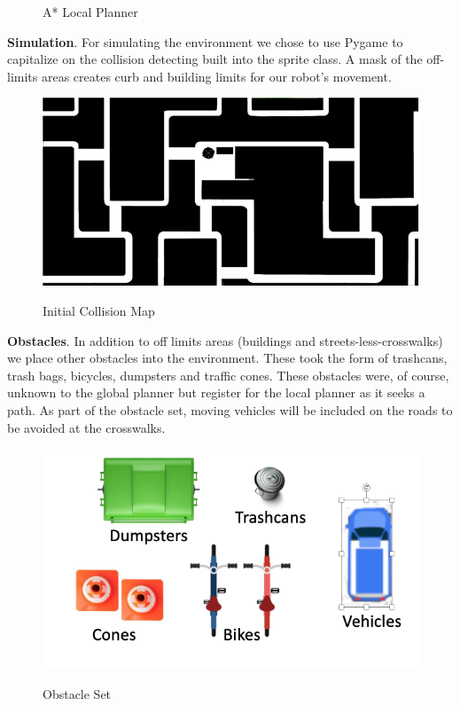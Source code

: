 \documentclass{article}
\begin{document}
\begin{multicols}{2}
\begin{figure}[H]
     \label{fig:astar}
     \caption{A* Local Planner}
\end{figure}
\noindent \textbf{Simulation}. For simulating the environment we chose to use Pygame to capitalize on the collision detecting built into the sprite class.  A mask of the off-limits areas creates curb and building limits for our robot's movement.
\begin{figure}[H]
   \centering
    \includegraphics[width = 1\columnwidth]{figures/mask.png}
     \label{fig:mask}
     \caption{Initial Collision Map}
\end{figure}

\noindent \textbf{Obstacles}. In addition to off limits areas (buildings and streets-less-crosswalks) we place other obstacles into the environment.  These took the form of trashcans, trash bags, bicycles, dumpsters and traffic cones.  These obstacles were, of course, unknown to the global planner but register for the local planner as it seeks a path.  As part of the obstacle set, moving vehicles will be included on the roads to be avoided at the crosswalks.
\begin{figure}[H]
   \centering
    \includegraphics[width = 1\columnwidth]{figures/obstacles.png}
     \label{fig:obstacles}
     \caption{Obstacle Set}
\end{figure}



\end{multicols}
\end{document}
